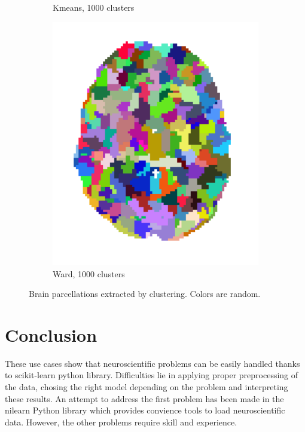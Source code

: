 \documentclass{frontiersSCNS} %
\begin{document}
\begin{figure}[hbtp]
\begin{subfigure}[b]{.23\linewidth}
        \caption{Kmeans, 1000 clusters}
      \end{subfigure}
      \hfill
      \begin{subfigure}[b]{.23\linewidth}
        \includegraphics[width=\linewidth]{img/clustering/ward_1000}
        \caption{Ward, 1000 clusters}
      \end{subfigure}
  \caption{Brain parcellations extracted by clustering. Colors are
random.}
  \label{fig:clustering}
\end{figure}

\section{Conclusion}

These use cases show that neuroscientific problems can be easily handled thanks
to scikit-learn python library. Difficulties lie in applying proper preprocessing of
the data, chosing the right model depending on the problem and interpreting
these results. An attempt to
address the first problem has been made in the nilearn Python library which
provides convience tools to load neuroscientific data. However, the other
problems require skill and experience.
\end{document}
